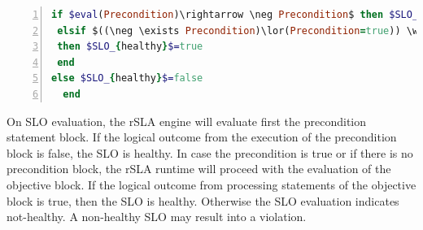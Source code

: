 \begin{lstlisting}[language=Ruby, basicstyle=\small\normalfont\sffamily, breaklines=true,  captionpos=b, mathescape=true, caption=rSLA SLO precondition-objective logic, label=ifelse, numbers=left, numbersep=5pt, numberstyle=\tiny]
if $eval(Precondition)\rightarrow \neg Precondition$ then $SLO_{healthy}$ = true
 elsif $((\neg \exists Precondition)\lor(Precondition=true)) \wedge eval(Objective) \rightarrow$ true
 then $SLO_{healthy}$=true 
 end
else $SLO_{healthy}$=false
  end
\end{lstlisting}

On SLO evaluation, the rSLA engine will evaluate first the precondition statement block. If the logical outcome from the execution of the precondition block is false, the SLO is healthy. In case the precondition is true or if there is no precondition block, the rSLA runtime will proceed with the evaluation of the objective block. If the logical outcome from processing statements of the objective block is true, then the SLO is healthy. Otherwise the SLO evaluation indicates not-healthy. A non-healthy SLO may result into a violation.